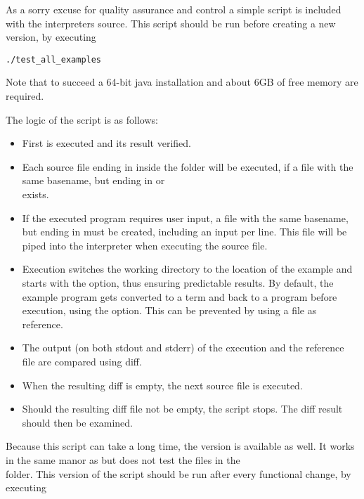 As a sorry excuse for quality assurance and control a simple  script is included with the interpreters source.
This script should be run before creating a new version, by executing

\begin{lstlisting}[frame=none,numbers=none]
./test_all_examples
\end{lstlisting}

Note that to succeed a 64-bit java installation and about 6GB of free memory are required.

The logic of the script is as follows:
\begin{itemize}
    \item First  is executed and its result verified.
    \item Each source file ending in  inside the  folder will be executed, if a file with the same basename, but ending in  or\\
      exists.
    \item If the executed program requires user input, a file with the same basename, but ending in  must be created, including an input per line. This file will be piped into the interpreter when executing the source file.
    \item Execution switches the working directory to the location of the example and starts \setlX{} with the
           option, thus ensuring predictable results. By default, the example program gets converted to a term and back to a program before execution, using the  option. This can be prevented by using a  file as reference.
    \item The output (on both stdout and stderr) of the execution and the reference file are compared using diff.
    \item When the resulting diff is empty, the next source file is executed.
    \item Should the resulting diff file not be empty, the script stops. The diff result should then be examined.
\end{itemize}

Because this script can take a long time, the  version is available as well.
It works in the same manor as  but does not test the files in the\\
 folder.
This version of the script should be run after every functional change, by executing

